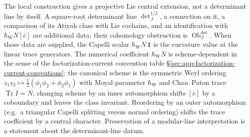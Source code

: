 \documentclass[11pt]{memoir}
\begin{document}
\begin{rmk}\label{rmk:determinant-line-scheme}
  The local construction gives a projective Lie central extension, not
  a determinant line by itself.  A square-root determinant line
  \(\det_J^{1/2}\), a connection on it, a comparison of its Atiyah
  class with Lie cochains, and an identification with
  \(\hbar_{\mathrm{W}}N[\bar c]\) are additional data; their cohomology
  obstruction is \(\operatorname{Ob}^{\det}_J\).  When those data are
  supplied, the Capelli scalar \(\hbar_{\mathrm{W}}N\,\mathbf 1\) is the
  curvature value at the linear trace generators.  The numerical
  coefficient \(\hbar_{\mathrm{W}}N\) is scheme-dependent in the sense of the
  factorization-current convention table
  \S\ref{sec:app-factorization-current-conventions}: the canonical
  scheme is the symmetric Weyl ordering
  \(z_1z_2\mapsto\tfrac12(\phi_1\phi_2+\phi_2\phi_1)\) with Moyal
  parameter \(\hbar_{\mathrm{W}}\) and Chan--Paton trace
  \(\operatorname{Tr}I=N\); changing scheme by an inner automorphism
  shifts \([\bar c]\) by a coboundary and leaves the class invariant.
  Reordering by an outer automorphism (e.g.\ a triangular Capelli
  splitting versus normal ordering) shifts the trace coefficient by
  a central character.  Preservation of a modular-line interpretation is
  a statement about the determinant-line datum.
\end{rmk}
\end{document}

